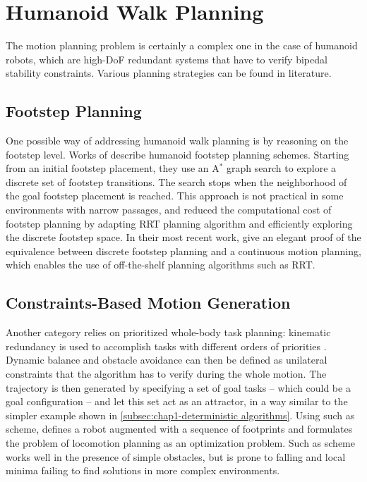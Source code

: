 \section{Humanoid Walk Planning}
\label{sec:chap1-humanoid-walk-planning}

The motion planning problem is certainly a complex one in the case of
humanoid robots, which are high-DoF redundant systems that have to
verify bipedal stability constraints. Various planning strategies can
be found in literature.

\subsection{Footstep Planning}
\label{subsec:chap1-footstep-planning}

One possible way of addressing humanoid walk planning is by reasoning
on the footstep level. Works of \cite{kuff01,ches05} describe humanoid
footstep planning schemes. Starting from an initial footstep
placement, they use an A$^{*}$ graph search \cite{hart68} to explore a
discrete set of footstep transitions. The search stops when the
neighborhood of the goal footstep placement is reached. This approach
is not practical in some environments with narrow passages, and
\cite{xia09, perr11a} reduced the computational cost of footstep
planning by adapting RRT planning algorithm and efficiently exploring
the discrete footstep space. In their most recent work, \cite{perr11b,
  perr12} give an elegant proof of the equivalence between discrete
footstep planning and a continuous motion planning, which enables the
use of off-the-shelf planning algorithms such as RRT.

\subsection{Constraints-Based Motion Generation}
\label{subsec:chap1-constraints-motion-generation}

Another category relies on prioritized whole-body task planning:
kinematic redundancy is used to accomplish tasks with different orders
of priorities \cite{khat04, saab11}. Dynamic balance and obstacle
avoidance can then be defined as unilateral constraints that the
algorithm has to verify during the whole motion. The trajectory is
then generated by specifying a set of goal tasks -- which could be a
goal configuration -- and let this set act as an attractor, in a way
similar to the simpler example shown in
\ref{subsec:chap1-deterministic algorithms}. Using such as scheme,
\cite{kano09} defines a robot augmented with a sequence of footprints
and formulates the problem of locomotion planning as an optimization
problem. Such as scheme works well in the presence of simple
obstacles, but is prone to falling and local minima failing to find
solutions in more complex environments.


